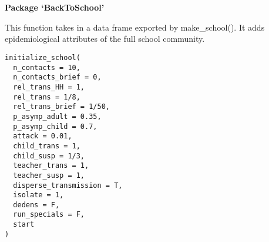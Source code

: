 \documentclass[a4paper]{book}
\begin{document}
\chapter*{}
\begin{center}
{\textbf{\huge Package `BackToSchool'}}
\par\bigskip{\large \today}
\end{center}
\begin{description}
\raggedright{}
\item[Title]
\item[Version]
\item[Imports]
\item[Description]
\item[License]
\item[Encoding]
\item[LazyData]
\item[Roxygen]
\item[RoxygenNote]
\end{description}
%
\begin{Description}\relax
This function takes in a data frame exported by make\_school().
It adds epidemiological attributes of the full school community.
\end{Description}
%
\begin{Usage}
\begin{verbatim}
initialize_school(
  n_contacts = 10,
  n_contacts_brief = 0,
  rel_trans_HH = 1,
  rel_trans = 1/8,
  rel_trans_brief = 1/50,
  p_asymp_adult = 0.35,
  p_asymp_child = 0.7,
  attack = 0.01,
  child_trans = 1,
  child_susp = 1/3,
  teacher_trans = 1,
  teacher_susp = 1,
  disperse_transmission = T,
  isolate = 1,
  dedens = F,
  run_specials = F,
  start
)
\end{verbatim}
\end{Usage}
%
\end{document}
